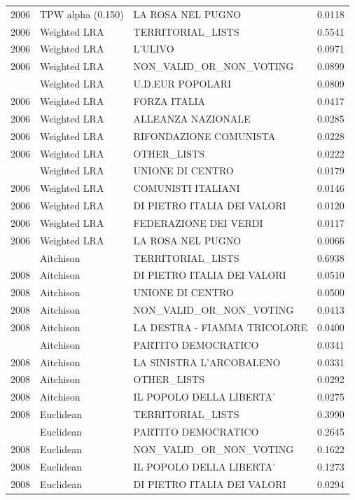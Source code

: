 \begin{longtable}[t]{rllr}
2006 & TPW alpha (0.150) & LA ROSA NEL PUGNO & 0.0118\\
2006 & Weighted LRA & TERRITORIAL\_LISTS & 0.5541\\
2006 & Weighted LRA & L'ULIVO & 0.0971\\
2006 & Weighted LRA & NON\_VALID\_OR\_NON\_VOTING & 0.0899\\
\addlinespace
2006 & Weighted LRA & U.D.EUR POPOLARI & 0.0809\\
2006 & Weighted LRA & FORZA ITALIA & 0.0417\\
2006 & Weighted LRA & ALLEANZA NAZIONALE & 0.0285\\
2006 & Weighted LRA & RIFONDAZIONE COMUNISTA & 0.0228\\
2006 & Weighted LRA & OTHER\_LISTS & 0.0222\\
\addlinespace
2006 & Weighted LRA & UNIONE DI CENTRO & 0.0179\\
2006 & Weighted LRA & COMUNISTI ITALIANI & 0.0146\\
2006 & Weighted LRA & DI PIETRO ITALIA DEI VALORI & 0.0120\\
2006 & Weighted LRA & FEDERAZIONE DEI VERDI & 0.0117\\
2006 & Weighted LRA & LA ROSA NEL PUGNO & 0.0066\\
\addlinespace
2008 & Aitchison & TERRITORIAL\_LISTS & 0.6938\\
2008 & Aitchison & DI PIETRO ITALIA DEI VALORI & 0.0510\\
2008 & Aitchison & UNIONE DI CENTRO & 0.0500\\
2008 & Aitchison & NON\_VALID\_OR\_NON\_VOTING & 0.0413\\
2008 & Aitchison & LA DESTRA - FIAMMA TRICOLORE & 0.0400\\
\addlinespace
2008 & Aitchison & PARTITO DEMOCRATICO & 0.0341\\
2008 & Aitchison & LA SINISTRA L'ARCOBALENO & 0.0331\\
2008 & Aitchison & OTHER\_LISTS & 0.0292\\
2008 & Aitchison & IL POPOLO DELLA LIBERTA' & 0.0275\\
2008 & Euclidean & TERRITORIAL\_LISTS & 0.3990\\
\addlinespace
2008 & Euclidean & PARTITO DEMOCRATICO & 0.2645\\
2008 & Euclidean & NON\_VALID\_OR\_NON\_VOTING & 0.1622\\
2008 & Euclidean & IL POPOLO DELLA LIBERTA' & 0.1273\\
2008 & Euclidean & DI PIETRO ITALIA DEI VALORI & 0.0294\\

\end{longtable}
